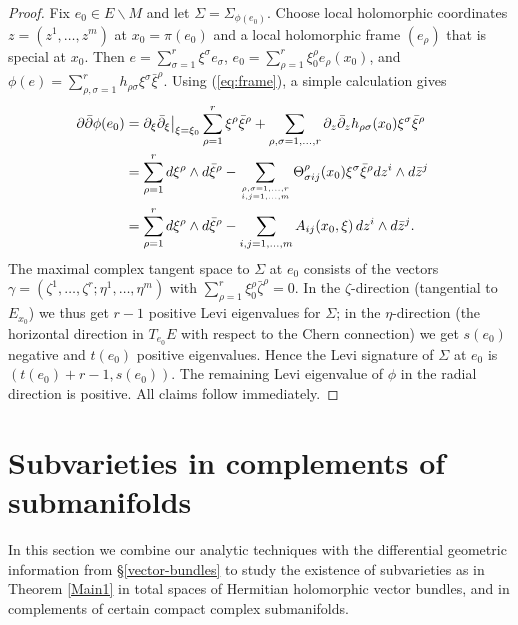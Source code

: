 \documentclass[11pt]{amsart}
\numberwithin{equation}{section}
\theoremstyle{definition}
\begin{document}
\begin{proof}  
Fix $e_0\in E{\backslash} M$ and let $\Sigma=\Sigma_{\phi(e_0)}$. 
Choose local holomorphic coordinates 
$z=(z^1,\ldots,z^m)$ at $x_0=\pi(e_0)$ and a local holomorphic frame 
$(e_\rho)$ that is special at $x_0$. 
Then $e=\sum_{\sigma=1}^r \xi^\sigma e_\sigma$, 
$e_0=\sum_{\rho=1}^r \xi_0^\rho e_\rho(x_0)$, and 
$\phi(e)= \sum_{\rho,\sigma=1}^r h_{\rho\sigma} \xi^\sigma\bar \xi^\rho$.
Using (\ref{eq:frame}), a simple calculation 
\cite[p.\ 426]{Griffiths66} gives
\begin{align*}
     {\partial}{\bar\partial} \phi(e_0) &=  {\partial}_\xi{\bar\partial}_\xi \big|_{\xi=\xi_0} \sum_{\rho=1}^r \xi^\rho\bar\xi^\rho 
     + \sum_{\rho,\sigma=1,\ldots,r} {\partial}_z{\bar\partial}_z h_{\rho\sigma}(x_0) \xi^\sigma \bar\xi^\rho \cr
     &= \sum_{\rho=1}^r d\xi^\rho\wedge d\bar\xi^\rho 
     - \sum_{{\genfrac{}{}{0pt}{}{{\rho,\sigma=1,\ldots,r}}{{i,j=1,\ldots,m}}}} 
     \Theta^\rho_{\sigma i j}(x_0) 
     	\xi^\sigma \bar\xi^\rho dz^i\wedge d\bar z^j  \cr
     &= \sum_{\rho=1}^r d\xi^\rho\wedge d\bar\xi^\rho 
        - \sum_{i,j=1,\ldots,m} A_{ij}(x_0,\xi)\, dz^i \wedge d\bar z^j.
\end{align*}
The maximal complex tangent space to $\Sigma$ at $e_0$ consists of the vectors 
$\gamma=(\zeta^1,\ldots,\zeta^r;\eta^1,\ldots,\eta^m)$ with 
$\sum_{\rho=1}^r \xi^\rho_0 \bar \zeta^\rho=0$. In the $\zeta$-direction
(tangential to $E_{x_0}$) we thus get $r-1$ positive 
Levi eigenvalues for $\Sigma$;
in the $\eta$-direction (the horizontal direction in $T_{e_0}E$ with 
respect to the Chern connection) we get $s(e_0)$ negative and $t(e_0)$  positive
eigenvalues. 
Hence the Levi signature of $\Sigma$ at $e_0$ is $(t(e_0)+r-1,s(e_0))$.
The remaining Levi eigenvalue of $\phi$ in the radial direction is positive. 
All claims follow immediately.
\end{proof} 
 

\section{Subvarieties in complements of submanifolds}
\label{subvariety-complements} 
In this section we combine our analytic techniques with
the differential geometric information from \S\ref{vector-bundles} 
to study the existence of subvarieties as in Theorem \ref{Main1} 
in total spaces of Hermitian holomorphic vector bundles, 
and in complements of certain compact complex submanifolds.
\end{document}
